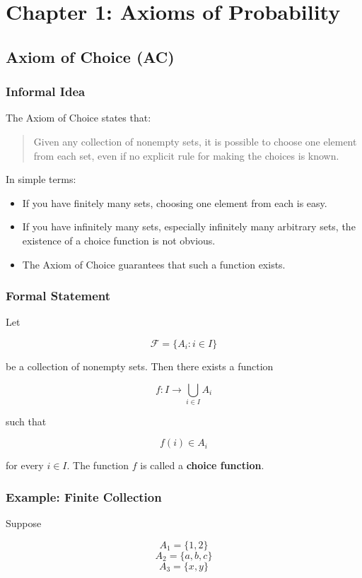 \documentclass[11pt]{article}
\author{Bazinevis}
\date{\today}
\title{}
\begin{document}
\tableofcontents

\section{Chapter 1: Axioms of Probability}
\label{sec:org754a5a2}
\subsection{Axiom of Choice (AC)}
\label{sec:org8b6f3b7}
\subsubsection{Informal Idea}
\label{sec:org2b36185}
The Axiom of Choice states that:

\begin{quote}
Given any collection of nonempty sets, it is possible to choose one element from each set, even if no explicit rule for making the choices is known.
\end{quote}

In simple terms:
\begin{itemize}
\item If you have finitely many sets, choosing one element from each is easy.
\item If you have infinitely many sets, especially infinitely many arbitrary sets, the existence of a choice function is not obvious.
\item The Axiom of Choice guarantees that such a function exists.
\end{itemize}
\subsubsection{Formal Statement}
\label{sec:orgf49d436}
Let

\[
\mathcal{F} = \{A_i : i \in I\}
\]

be a collection of nonempty sets. Then there exists a function

\[
f : I \to \bigcup_{i\in I} A_i
\]

such that

\[
f(i) \in A_i
\]

for every \(i \in I\). The function \(f\) is called a \textbf{choice function}.
\subsubsection{Example: Finite Collection}
\label{sec:orgc98abb5}
Suppose

\[
A_1=\{1,2\}
\]
\[
A_2=\{a,b,c\}
\]
\[
A_3=\{x,y\}
\]
\end{document}
